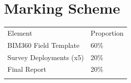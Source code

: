 \section*{Marking Scheme}
\begin{table}[h!]
	\begin{center}
		\begin{tabular}{p{8cm}  p{2cm} }
			\toprule
			\large{Element} & \large{Proportion} \\ 
			\cmidrule(r){1-1}\cmidrule(lr){2-2}
			BIM360 Field Template & 60\%\\
			Survey Deployments (x5) & 20\%\\
			Final Report & 20\%\\     
			\\ \bottomrule
		\end{tabular}
		\label{tbl:markSchemeAsmt3}
	\end{center}
\end{table}


